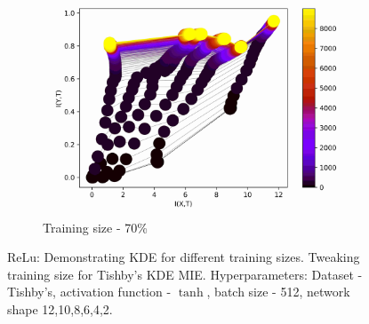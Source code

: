 \documentclass[dissertation.tex]{subfiles}
\begin{document}
\begin{figure}[ht]
\begin{subfigure}[t]{0.32\textwidth}
    \includegraphics[width=\textwidth]{figs/eval/trainingSizeRelu/KDE70.jpg}
    \caption{
      Training size - 70\%
    }
  \end{subfigure}
  \caption{
      ReLu: Demonstrating KDE for different training sizes.  Tweaking training
      size for Tishby's KDE MIE. Hyperparameters: Dataset - Tishby's, activation
      function - $\tanh$, batch size - 512, network shape 12,10,8,6,4,2.
    }
  \label{figKDETSReluAA}
\end{figure}
  
\end{document}
